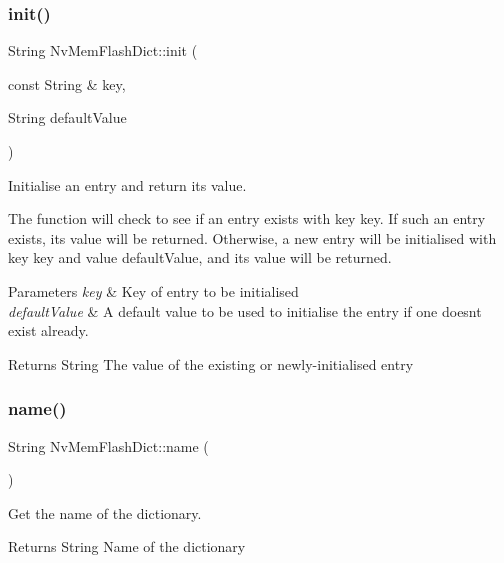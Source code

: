 \subsubsection{\texorpdfstring{init()}{init()}}
{\footnotesize\ttfamily String Nv\+Mem\+Flash\+Dict\+::init (\begin{DoxyParamCaption}\item[{const String \&}]{key,  }\item[{String}]{default\+Value }\end{DoxyParamCaption})}



Initialise an entry and return its value. 

The function will check to see if an entry exists with key {\ttfamily key}. If such an entry exists, its value will be returned. Otherwise, a new entry will be initialised with key {\ttfamily key} and value {\ttfamily default\+Value}, and its value will be returned.


\begin{DoxyParams}{Parameters}
{\em key} & Key of entry to be initialised \\
\hline
{\em default\+Value} & A default value to be used to initialise the entry if one doesn\textquotesingle{}t exist already. \\
\hline
\end{DoxyParams}
\begin{DoxyReturn}{Returns}
String The value of the existing or newly-\/initialised entry 
\end{DoxyReturn}
\mbox{\label{class_nv_mem_flash_dict_a55888a3489875052acc0602499cc73fe}} 
\subsubsection{\texorpdfstring{name()}{name()}}
{\footnotesize\ttfamily String Nv\+Mem\+Flash\+Dict\+::name (\begin{DoxyParamCaption}{ }\end{DoxyParamCaption})}



Get the name of the dictionary. 

\begin{DoxyReturn}{Returns}
String Name of the dictionary 
\end{DoxyReturn}
\mbox{\label{class_nv_mem_flash_dict_a82853c97e48c0bfcef79afde94ba0b56}} 
